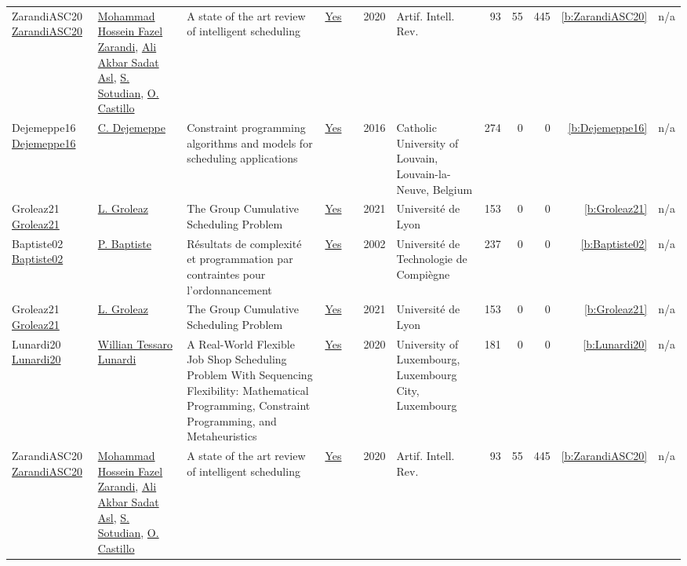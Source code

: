 {\begin{longtable}{>{\raggedright\arraybackslash}p{3cm}>{\raggedright\arraybackslash}p{6cm}>{\raggedright\arraybackslash}p{6.5cm}rrrp{2.5cm}rrrrr}
ZarandiASC20 \href{https://doi.org/10.1007/s10462-018-9667-6}{ZarandiASC20} & \hyperref[auth:a835]{Mohammad Hossein Fazel Zarandi}, \hyperref[auth:a836]{Ali Akbar Sadat Asl}, \hyperref[auth:a837]{S. Sotudian}, \hyperref[auth:a838]{O. Castillo} & A state of the art review of intelligent scheduling & \href{../works/ZarandiASC20.pdf}{Yes} & \cite{ZarandiASC20} & 2020 & Artif. Intell. Rev. & 93 & 55 & 445 & \ref{b:ZarandiASC20} & n/a\\
Dejemeppe16 \href{https://hdl.handle.net/2078.1/178078}{Dejemeppe16} & \hyperref[auth:a207]{C. Dejemeppe} & Constraint programming algorithms and models for scheduling applications & \href{../works/Dejemeppe16.pdf}{Yes} & \cite{Dejemeppe16} & 2016 & Catholic University of Louvain, Louvain-la-Neuve, Belgium & 274 & 0 & 0 & \ref{b:Dejemeppe16} & n/a\\
Groleaz21 \href{https://hal.science/tel-03266690}{Groleaz21} & \hyperref[auth:a83]{L. Groleaz} & {The Group Cumulative Scheduling Problem} & \href{../works/Groleaz21.pdf}{Yes} & \cite{Groleaz21} & 2021 & {Universit{\'e} de Lyon} & 153 & 0 & 0 & \ref{b:Groleaz21} & n/a\\
Baptiste02 \href{https://theses.hal.science/tel-00124998}{Baptiste02} & \hyperref[auth:a163]{P. Baptiste} & {R{\'e}sultats de complexit{\'e} et programmation par contraintes pour l'ordonnancement} & \href{../works/Baptiste02.pdf}{Yes} & \cite{Baptiste02} & 2002 & {Universit{\'e} de Technologie de Compi{\`e}gne} & 237 & 0 & 0 & \ref{b:Baptiste02} & n/a\\
Groleaz21 \href{https://hal.science/tel-03266690}{Groleaz21} & \hyperref[auth:a83]{L. Groleaz} & {The Group Cumulative Scheduling Problem} & \href{../works/Groleaz21.pdf}{Yes} & \cite{Groleaz21} & 2021 & {Universit{\'e} de Lyon} & 153 & 0 & 0 & \ref{b:Groleaz21} & n/a\\
Lunardi20 \href{http://orbilu.uni.lu/handle/10993/43893}{Lunardi20} & \hyperref[auth:a499]{Willian Tessaro Lunardi} & A Real-World Flexible Job Shop Scheduling Problem With Sequencing Flexibility: Mathematical Programming, Constraint Programming, and Metaheuristics & \href{../works/Lunardi20.pdf}{Yes} & \cite{Lunardi20} & 2020 & University of Luxembourg, Luxembourg City, Luxembourg & 181 & 0 & 0 & \ref{b:Lunardi20} & n/a\\
ZarandiASC20 \href{https://doi.org/10.1007/s10462-018-9667-6}{ZarandiASC20} & \hyperref[auth:a835]{Mohammad Hossein Fazel Zarandi}, \hyperref[auth:a836]{Ali Akbar Sadat Asl}, \hyperref[auth:a837]{S. Sotudian}, \hyperref[auth:a838]{O. Castillo} & A state of the art review of intelligent scheduling & \href{../works/ZarandiASC20.pdf}{Yes} & \cite{ZarandiASC20} & 2020 & Artif. Intell. Rev. & 93 & 55 & 445 & \ref{b:ZarandiASC20} & n/a\\

\end{longtable}}
